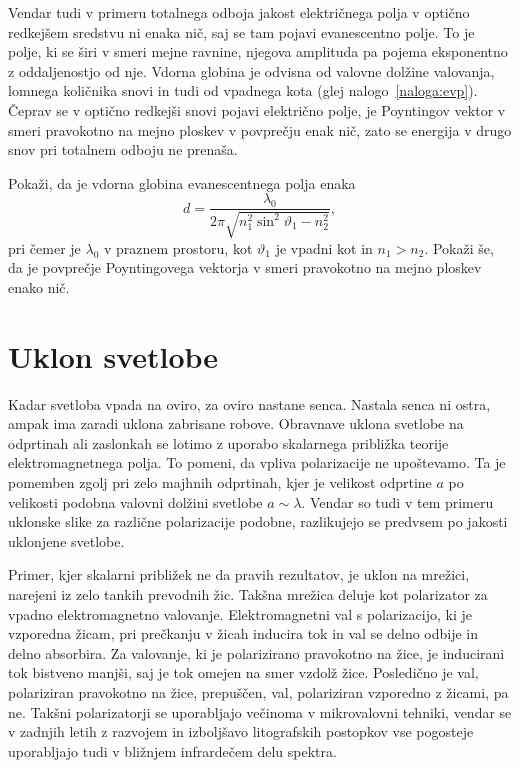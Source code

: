 Vendar tudi v primeru totalnega odboja jakost električnega polja v optično redkejšem sredstvu
ni enaka nič, saj se tam pojavi evanescentno polje.
To je polje, ki se širi v smeri mejne ravnine, njegova amplituda pa pojema 
eksponentno z oddaljenostjo od nje. Vdorna globina je odvisna od valovne 
dolžine valovanja, lomnega količnika snovi in tudi od vpadnega kota  (glej 
nalogo~\ref{naloga:evp}). Čeprav se v optično redkejši snovi pojavi električno polje, je Poyntingov
vektor v smeri pravokotno na mejno ploskev v povprečju enak nič, zato se energija
v drugo snov pri totalnem odboju ne prenaša.
\begin{definition}
\label{naloga:evp}
Pokaži, da je vdorna globina evanescentnega polja enaka
\begin{equation}
d = \frac{\lambda_0}{2 \pi\sqrt{n_1^2 \sin^2 \vartheta_1 - n_2^2}},
\end{equation}
pri čemer je $\lambda_0$ v praznem prostoru, 
kot $\vartheta_1$ je vpadni kot in $n_1>n_2$.
Pokaži še, da je povprečje Poyntingovega vektorja v smeri pravokotno na mejno 
ploskev enako nič. 
\end{definition}

\section{Uklon svetlobe}
Kadar svetloba vpada na oviro, za oviro nastane senca. Nastala senca ni ostra, ampak
ima zaradi uklona zabrisane robove. Obravnave 
uklona svetlobe na odprtinah ali zaslonkah se lotimo z uporabo
skalarnega približka teorije elektromagnetnega polja. To pomeni, da vpliva 
polarizacije ne upoštevamo. Ta je pomemben zgolj pri zelo majhnih odprtinah, 
kjer je velikost odprtine $a$ po velikosti podobna valovni dolžini svetlobe $a \sim \lambda$. 
Vendar so tudi v tem primeru uklonske slike za različne polarizacije podobne, 
razlikujejo se predvsem po jakosti uklonjene svetlobe.
\begin{remark}
Primer, kjer skalarni približek ne da pravih rezultatov, je uklon na mrežici, narejeni 
iz zelo tankih prevodnih žic. Takšna mrežica deluje kot polarizator za vpadno elektromagnetno valovanje.
Elektromagnetni val s polarizacijo, ki je vzporedna žicam, pri prečkanju v žicah inducira tok
in val se delno odbije in delno absorbira. Za valovanje, ki je polarizirano pravokotno 
na žice, je  inducirani tok bistveno manjši, saj je tok omejen na smer
vzdolž žice. Posledično je val, polariziran pravokotno na žice, prepuščen, 
val, polariziran vzporedno z žicami, pa ne. 
Takšni polarizatorji se uporabljajo večinoma v mikrovalovni tehniki, 
vendar se v zadnjih letih z razvojem in izboljšavo litografskih postopkov
vse pogosteje uporabljajo tudi v bližnjem infrardečem delu spektra.
\end{remark}

